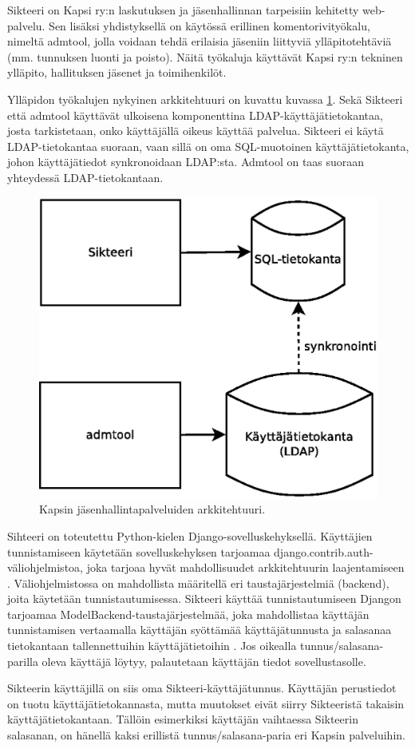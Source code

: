 Sikteeri on Kapsi ry:n laskutuksen ja jäsenhallinnan tarpeisiin kehitetty web-palvelu. Sen lisäksi yhdistyksellä on käytössä erillinen komentorivityökalu, nimeltä admtool, jolla voidaan tehdä erilaisia jäseniin liittyviä ylläpitotehtäviä (mm. tunnuksen luonti ja poisto). Näitä työkaluja käyttävät Kapsi ry:n tekninen ylläpito, hallituksen jäsenet ja toimihenkilöt.

Ylläpidon työkalujen nykyinen arkkitehtuuri on kuvattu kuvassa \ref{kapsi_nykyinen}. Sekä Sikteeri että admtool käyttävät ulkoisena komponenttina LDAP-käyt\-tä\-jä\-tie\-to\-kan\-taa, josta tarkistetaan, onko käyttäjällä oikeus käyttää palvelua. Sikteeri ei käytä LDAP-tietokantaa suoraan, vaan sillä on oma SQL-muotoinen käyttäjätietokanta, johon käyttäjätiedot synkronoidaan LDAP:sta. Admtool on taas suoraan yhteydessä LDAP-tietokantaan.

\begin{figure}[h]
\centering
\includegraphics[width=.7\textwidth]{toteutus/kapsi_nykyinen.eps}
\caption{Kapsin jäsenhallintapalveluiden arkkitehtuuri.}%
\label{kapsi_nykyinen}
\end{figure}

Sihteeri on toteutettu Python-kielen Django-so\-vel\-lus\-ke\-hyk\-sel\-lä. Käyttäjien tunnistamiseen käytetään sovelluskehyksen tarjoamaa django.contrib.auth-vä\-li\-oh\-jel\-mis\-to\-a, joka tarjoaa hyvät mahdollisuudet arkkitehtuurin laajentamiseen \cite{django_auth}. Väliohjelmistossa on mahdollista määritellä eri taustajärjestelmiä (backend), joita käytetään tunnistautumisessa. Sikteeri käyttää tunnistautumiseen Djangon tarjoamaa ModelBackend-taustajärjestelmää, joka mahdollistaa käyttäjän tunnistamisen vertaamalla käyttäjän syöttämää käyttäjätunnusta ja salasanaa tietokantaan tallennettuihin käyttäjätietoihin \cite{django_auth}. Jos oikealla tunnus/salasana-parilla oleva käyttäjä löytyy, palautetaan käyttäjän tiedot sovellustasolle.

Sikteerin käyttäjillä on siis oma Sikteeri-käyttäjätunnus. Käyttäjän perustiedot on tuotu käyttäjätietokannasta, mutta muutokset eivät siirry Sikteeristä takaisin käyttäjätietokantaan. Tällöin esimerkiksi käyttäjän vaihtaessa Sikteerin salasanan, on hänellä kaksi erillistä tunnus/salasana-paria eri Kapsin palveluihin.